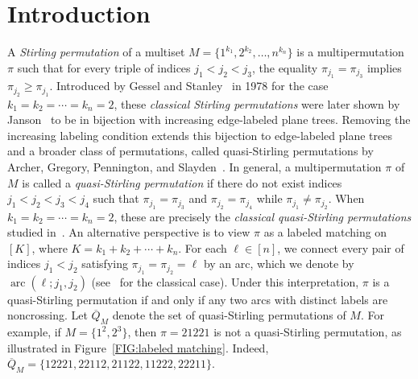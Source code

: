 \documentclass[11pt]{article}
\DeclareMathOperator{\ar}{arc}
\numberwithin{equation}{section}
\def\oQ{\overline{Q}}
\begin{document}
\section{Introduction}


A \textit{Stirling permutation} of a multiset $M=\{1^{k_1},2^{k_2},\ldots,n^{k_n}\}$ is a multipermutation $\pi$ such that for every triple of indices $j_1<j_2<j_3$, the equality $\pi_{j_1}=\pi_{j_3}$ implies $\pi_{j_2}\ge \pi_{j_1}$. Introduced by Gessel and Stanley~\cite{Gessel1978} in 1978 for the case $k_1=k_2=\cdots=k_n=2$, these \textit{classical Stirling permutations} were later shown by Janson~\cite{Janson2008} to be in bijection with increasing edge-labeled plane trees. Removing the increasing labeling condition extends this bijection to edge-labeled plane trees and a broader class of permutations, called quasi-Stirling permutations by Archer, Gregory, Pennington, and Slayden~\cite{Archer2019-1}. In general, a multipermutation $\pi$ of $M$ is called a \textit{quasi-Stirling permutation} if there do not exist indices $j_1<j_2<j_3<j_4$ such that $\pi_{j_1}=\pi_{j_3}$ and $\pi_{j_2}=\pi_{j_4}$ while $\pi_{j_1}\ne\pi_{j_2}$. When $k_1=k_2=\cdots=k_n=2$, these are precisely the \emph{classical quasi-Stirling permutations} studied in~\cite{Archer2019-1}. An alternative perspective is to view $\pi$ as a labeled matching on $[K]$, where $K=k_1+k_2+\cdots+k_n$. For each $\ell\in[n]$, we connect every pair of indices $j_1<j_2$ satisfying $\pi_{j_1}=\pi_{j_2}=\ell$ by an arc, which we denote by $\ar(\ell;j_1,j_2)$ (see~\cite[Exercise~6.19(o)]{StanleyBook2} for the classical case). Under this interpretation, $\pi$ is a quasi-Stirling permutation if and only if any two arcs with distinct labels are noncrossing. Let $\oQ_M$ denote the set of quasi-Stirling permutations of $M$. For example, if $M=\{1^2,2^3\}$, then $\pi=21221$ is not a quasi-Stirling permutation, as illustrated in Figure~\ref{FIG:labeled matching}. Indeed, $\oQ_M=\{12221,22112,21122,11222,22211\}$.
\end{document}
